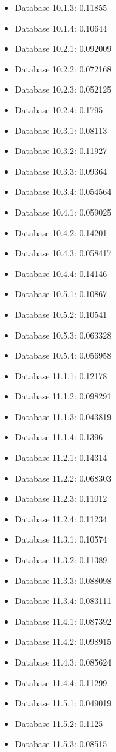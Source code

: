 \begin{itemize}
\item Database 10.1.3: 0.11855
\item Database 10.1.4: 0.10644
\item Database 10.2.1: 0.092009
\item Database 10.2.2: 0.072168
\item Database 10.2.3: 0.052125
\item Database 10.2.4: 0.1795
\item Database 10.3.1: 0.08113
\item Database 10.3.2: 0.11927
\item Database 10.3.3: 0.09364
\item Database 10.3.4: 0.054564
\item Database 10.4.1: 0.059025
\item Database 10.4.2: 0.14201
\item Database 10.4.3: 0.058417
\item Database 10.4.4: 0.14146
\item Database 10.5.1: 0.10867
\item Database 10.5.2: 0.10541
\item Database 10.5.3: 0.063328
\item Database 10.5.4: 0.056958
\item Database 11.1.1: 0.12178
\item Database 11.1.2: 0.098291
\item Database 11.1.3: 0.043819
\item Database 11.1.4: 0.1396
\item Database 11.2.1: 0.14314
\item Database 11.2.2: 0.068303
\item Database 11.2.3: 0.11012
\item Database 11.2.4: 0.11234
\item Database 11.3.1: 0.10574
\item Database 11.3.2: 0.11389
\item Database 11.3.3: 0.088098
\item Database 11.3.4: 0.083111
\item Database 11.4.1: 0.087392
\item Database 11.4.2: 0.098915
\item Database 11.4.3: 0.085624
\item Database 11.4.4: 0.11299
\item Database 11.5.1: 0.049019
\item Database 11.5.2: 0.1125
\item Database 11.5.3: 0.08515

\end{itemize}
